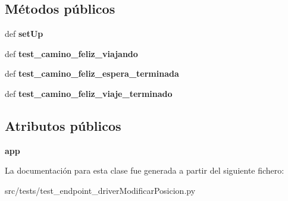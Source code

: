 \subsection*{Métodos públicos}
\begin{DoxyCompactItemize}
\item 
\hypertarget{classsrc_1_1tests_1_1test__endpoint__driver_modificar_posicion_1_1_test_endpoint_driver_modificar_posicion_a54a723c21258dadb3ca77b919d60fbcd}{def {\bfseries set\-Up}}\label{classsrc_1_1tests_1_1test__endpoint__driver_modificar_posicion_1_1_test_endpoint_driver_modificar_posicion_a54a723c21258dadb3ca77b919d60fbcd}

\item 
\hypertarget{classsrc_1_1tests_1_1test__endpoint__driver_modificar_posicion_1_1_test_endpoint_driver_modificar_posicion_a84184a1be1291a38b38e3d0056126c0a}{def {\bfseries test\-\_\-camino\-\_\-feliz\-\_\-viajando}}\label{classsrc_1_1tests_1_1test__endpoint__driver_modificar_posicion_1_1_test_endpoint_driver_modificar_posicion_a84184a1be1291a38b38e3d0056126c0a}

\item 
\hypertarget{classsrc_1_1tests_1_1test__endpoint__driver_modificar_posicion_1_1_test_endpoint_driver_modificar_posicion_a694ad70eef59fb38480d0677efe4c3b0}{def {\bfseries test\-\_\-camino\-\_\-feliz\-\_\-espera\-\_\-terminada}}\label{classsrc_1_1tests_1_1test__endpoint__driver_modificar_posicion_1_1_test_endpoint_driver_modificar_posicion_a694ad70eef59fb38480d0677efe4c3b0}

\item 
\hypertarget{classsrc_1_1tests_1_1test__endpoint__driver_modificar_posicion_1_1_test_endpoint_driver_modificar_posicion_a5433a9d27daff49745149e7d37bad02e}{def {\bfseries test\-\_\-camino\-\_\-feliz\-\_\-viaje\-\_\-terminado}}\label{classsrc_1_1tests_1_1test__endpoint__driver_modificar_posicion_1_1_test_endpoint_driver_modificar_posicion_a5433a9d27daff49745149e7d37bad02e}

\end{DoxyCompactItemize}
\subsection*{Atributos públicos}
\begin{DoxyCompactItemize}
\item 
\hypertarget{classsrc_1_1tests_1_1test__endpoint__driver_modificar_posicion_1_1_test_endpoint_driver_modificar_posicion_a04482e3e68f4366d6cff0de0af11bff6}{{\bfseries app}}\label{classsrc_1_1tests_1_1test__endpoint__driver_modificar_posicion_1_1_test_endpoint_driver_modificar_posicion_a04482e3e68f4366d6cff0de0af11bff6}

\end{DoxyCompactItemize}


La documentación para esta clase fue generada a partir del siguiente fichero\-:\begin{DoxyCompactItemize}
\item 
src/tests/test\-\_\-endpoint\-\_\-driver\-Modificar\-Posicion.\-py\end{DoxyCompactItemize}
